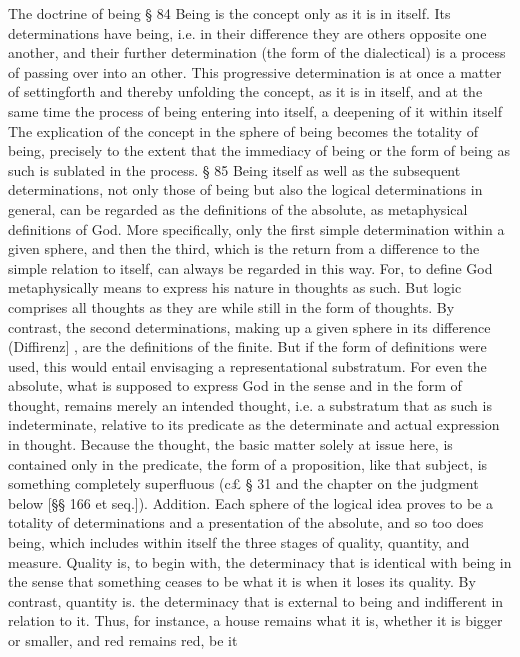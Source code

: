 The doctrine of being
§ 84
Being is the concept only as it is in itself. Its determinations have being, i.e.
in their difference they are others opposite one another, and their further
determination (the form of the dialectical) is a process of passing over into
an other. This progressive determination is at once a matter of settingforth
and thereby unfolding the concept, as it is in itself, and at the same time
the process of being entering into itself, a deepening of it within itself The
explication of the concept in the sphere of being becomes the totality of
being, precisely to the extent that the immediacy of being or the form of
being as such is sublated in the process.
§ 85
Being itself as well as the subsequent determinations, not only those of
being but also the logical determinations in general, can be regarded as
the definitions of the absolute, as metaphysical definitions of God. More
specifically, only the first simple determination within a given sphere, and
then the third, which is the return from a difference to the simple relation to
itself, can always be regarded in this way. For, to define God metaphysically
means to express his nature in thoughts as such. But logic comprises all
thoughts as they are while still in the form of thoughts. By contrast, the
second determinations, making up a given sphere in its difference (Diffirenz] ,
are the definitions of the finite. But if the form of definitions were used,
this would entail envisaging a representational substratum. For even the
absolute, what is supposed to express God in the sense and in the form
of thought, remains merely an intended thought, i.e. a substratum that as
such is indeterminate, relative to its predicate as the determinate and actual
expression in thought. Because the thought, the basic matter solely at issue
here, is contained only in the predicate, the form of a proposition, like that
subject, is something completely superfluous (c£ § 31 and the chapter on
the judgment below [§§ 166 et seq.]).
Addition. Each sphere of the logical idea proves to be a totality of determinations
and a presentation of the absolute, and so too does being, which includes within
itself the three stages of quality, quantity, and measure. Quality is, to begin with,
the determinacy that is identical with being in the sense that something ceases
to be what it is when it loses its quality. By contrast, quantity is. the determinacy
that is external to being and indifferent in relation to it. Thus, for instance, a
house remains what it is, whether it is bigger or smaller, and red remains red, be it
